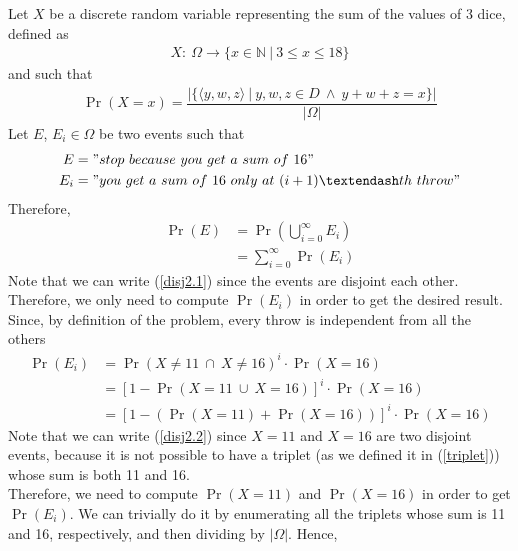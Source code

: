 Let $X$ be a discrete random variable representing the sum of the values of 3 dice, defined as
\begin{align*}
	X: \ \Omega \longrightarrow \{ x \in \mathbb{N} \ | \ 3 \leq x \leq 18 \}
\end{align*}
and such that
\begin{align}
	\Pr(X = x) = \dfrac{|\{ \langle y,w,z \rangle \ | \ y,w,z \in D \ \wedge \ y+w+z = x \}|}{|\Omega|} \label{triplet}
\end{align}
Let $E$, $E_i \in \Omega$ be two events such that
\begin{align*}
	E &= "stop \ because \ you \ get \ a \ sum \ of \ 16"\\
	E_i &= "you \ get \ a \ sum \ of \ 16 \ only \ at \ (i+1) \textendash th \ throw"
\end{align*}
Therefore,
\begin{align}
	\Pr(E) &= \Pr\left(\bigcup_{i = 0}^{\infty} E_i \right) \nonumber\\
		&= \sum_{i = 0}^{\infty}\Pr(E_i) \label{disj2.1}
\end{align}
Note that we can write (\ref{disj2.1}) since the events are disjoint each other.\\
Therefore, we only need to compute $\Pr(E_i)$ in order to get the desired result. Since, by definition of the problem, every throw is independent from all the others
\begin{align}
	\Pr(E_i) &= \Pr( X \ne 11 \ \cap \ X \ne 16 )^i \cdot \Pr(X = 16) \nonumber\\
			&= [1 - \Pr( X = 11 \ \cup \ X = 16)]^i \cdot \Pr(X = 16) \nonumber\\
			&= [1 - (\Pr(X = 11) + \Pr( X = 16))]^i \cdot \Pr(X = 16) \label{disj2.2}
\end{align}
Note that we can write (\ref{disj2.2}) since $X = 11$ and $X = 16$ are two disjoint events, because it is not possible to have a triplet (as we defined it in (\ref{triplet})) whose sum is both 11 and 16.\\
Therefore, we need to compute $\Pr(X = 11)$ and $\Pr( X = 16)$ in order to get $\Pr(E_i)$. We can trivially do it by enumerating all the triplets whose sum is 11 and 16, respectively, and then dividing by $|\Omega|$. Hence,


